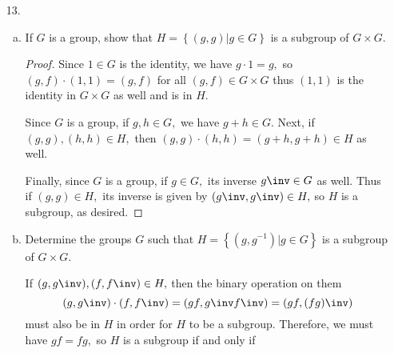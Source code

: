 \documentclass{article}
\begin{document}
\begin{itemize}
\begin{enumerate}[(a)]
\begin{proof}
				\end{proof}
				
		\end{enumerate}
	\item[13.] 
		\begin{enumerate}[(a)]
			\item If $G$ is a group, show that $H=\left\{ (g, g) | g\in G \right\}$ is a subgroup of $G\times G.$
				\begin{proof}
					Since $1\in G$ is the identity, we have $g\cdot 1=g,$ so $(g, f)\cdot(1, 1)=(g, f)$ for all $(g, f)\in G\times G$ thus $(1, 1)$ is the identity in $G\times G$ as well and is in $H.$

					Since $G$ is a group, if $g, h\in G,$ we have $g+h\in G.$ Next, if $(g, g), (h, h)\in H,$ then $(g, g)\cdot(h, h)=(g+h, g+h)\in H$ as well. 

					Finally, since $G$ is a group, if $g\in G,$ its inverse $g\inv\in G$ as well. Thus if $(g, g)\in H,$ its inverse is given by $(g\inv, g\inv)\in H,$ so $H$ is a subgroup, as desired.
					
				\end{proof}

			\item Determine the groups $G$ such that $H=\left\{ (g, g^{-1})|g\in G \right\}$ is a subgroup of $G\times G.$
				\begin{soln}
					If $(g, g\inv), (f, f\inv)\in H,$ then the binary operation on them \[(g, g\inv)\cdot(f, f\inv)=(gf, g\inv f\inv)=(gf, (fg)\inv)\] must also be in $H$ in order for $H$ to be a subgroup. Therefore, we must have $gf=fg,$ so $H$ is a subgroup if and only if 
					
				\end{soln}
				
		\end{enumerate}


\end{itemize}
\end{document}
